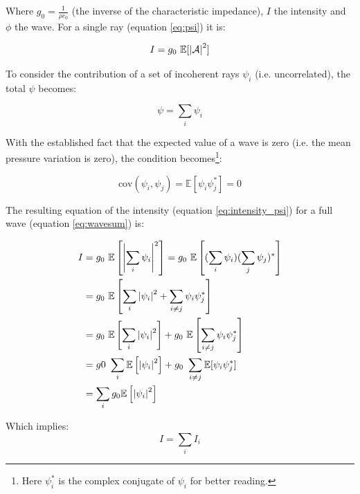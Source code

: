 Where $g_0 = \tfrac{1}{\rho c_0}$ (the inverse of the characteristic impedance),
$I$ the intensity and $\phi$ the wave.
For a single ray (equation \ref{eq:psi}) it is:

\begin{equation*}
I = g_0~\mathbb{E}[\left|\mathcal{A}\right|^2]
\end{equation*}

To consider the contribution of a set of incoherent rays $\psi_i$ (i.e.
uncorrelated), the total $\psi$ becomes:

\begin{equation}\label{eq:wavesum}
\psi = \sum_i \psi_i 
\end{equation}

With the established fact that the expected value of a wave is zero (i.e. the
mean pressure variation is zero), the condition
becomes\footnote{Here $\psi_i^*$ is the complex conjugate of $\psi_i$ for
better reading.}:


\begin{equation}
\label{eq:wave_uncorr}
\text{cov}(\psi_i,\psi_j) = \mathbb{E}[\psi_i \psi_j^*] = 0
\end{equation}

The resulting equation of the intensity (equation \ref{eq:intensity_psi}) for a
full wave (equation \ref{eq:wavesum}) is:

\begin{equation*}
\begin{split}
I &= g_0~\mathbb{E}\left[\left| \sum_i \psi_i \right| ^2\right] =
g_0~\mathbb{E}\left[ (\sum_i \psi_i)(\sum_j \psi_j)^*\right] \\
&= g_0~\mathbb{E}\left[\sum_i \left|\psi_i\right|^2 + \sum_{i \neq j} \psi_i
\psi_j^*\right] \\
&= g_0~\mathbb{E}\left[\sum_i \left|\psi_i\right|^2\right]  +
g_0~\mathbb{E}\left[\sum_{i \neq j} \psi_i \psi_j^*\right] \\
& = g0~\sum_i \mathbb{E}\left[\left|\psi_i\right|^2\right]  + g_0~\sum_{i \neq j}
\mathbb{E}[\psi_i \psi_j^*] \\
& = \sum_i g_0\mathbb{E}\left[\left|\psi_i\right|^2\right]
\end{split}
\end{equation*}

Which implies:
\begin{equation}
\label{eq:intensity_sum}
I = \sum_i I_i
\end{equation}

